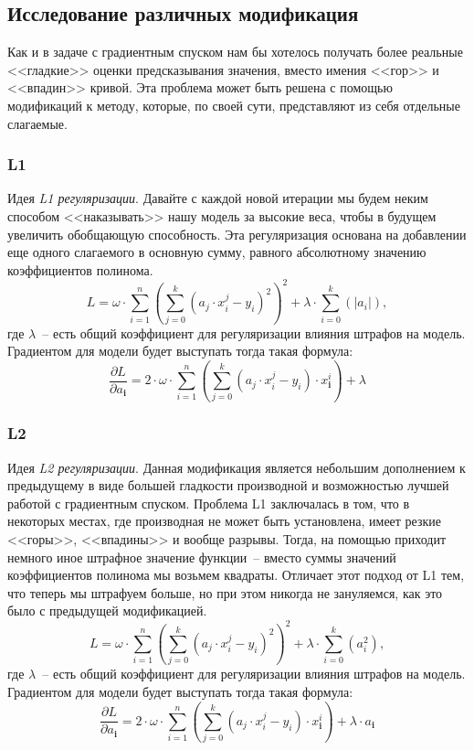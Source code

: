 \documentclass[12pt, a4paper, oneside, final]{article}
\begin{document}
	\subsection*{Исследование различных модификация}
	Как и в задаче с градиентным спуском нам бы хотелось получать более реальные <<гладкие>> оценки предсказывания значения, вместо имения <<гор>> и <<впадин>> кривой.
	Эта проблема может быть решена с помощью модификаций к методу, которые, по своей сути, представляют из себя отдельные слагаемые.
	\subsubsection*{L1}
	Идея \textit{L1 регуляризации}.
	Давайте с каждой новой итерации мы будем неким способом <<наказывать>> нашу модель за высокие веса, чтобы в будущем увеличить обобщающую способность.
	Эта регуляризация основана на добавлении еще одного слагаемого в основную сумму, равного абсолютному значению коэффициентов полинома.
	\[
		L = \omega \cdot \sum\limits_{i = 1}^{n}{\left(\sum\limits_{j = 0}^{k}{\left(a_{j} \cdot x_{i}^{j} - y_{i}\right)^{2}}\right)^{2}} + \lambda \cdot \sum\limits_{i = 0}^{k}{\left(|a_{i}|\right)},
	\]
	где $\lambda$~-- есть общий коэффициент для регуляризации влияния штрафов на модель.
	Градиентом для модели будет выступать тогда такая формула:
	\[
		\dfrac{\partial{L}}{\partial{a_{\mathbf{i}}}} = 2 \cdot \omega \cdot \sum\limits_{i = 1}^{n}{\left(\sum\limits_{j = 0}^{k}{\left(a_{j} \cdot x_{i}^{j} - y_{i}\right) \cdot x^{i}_{\mathbf{i}}}\right)} + \lambda
	\]
	\subsubsection*{L2}
	Идея \textit{L2 регуляризации}.
	Данная модификация является небольшим дополнением к предыдущему в виде большей гладкости производной и возможностью лучшей работой с градиентным спуском.
	Проблема L1 заключалась в том, что в некоторых местах, где производная не может быть установлена, имеет резкие <<горы>>, <<впадины>> и вообще разрывы.
	Тогда, на помощью приходит немного иное штрафное значение функции~-- вместо суммы значений коэффициентов полинома мы возьмем квадраты.
	Отличает этот подход от L1 тем, что теперь мы штрафуем больше, но при этом никогда не зануляемся, как это было с предыдущей модификацией.
	\[
		L = \omega \cdot \sum\limits_{i = 1}^{n}{\left(\sum\limits_{j = 0}^{k}{\left(a_{j} \cdot x_{i}^{j} - y_{i}\right)^{2}}\right)^{2}} + \lambda \cdot \sum\limits_{i = 0}^{k}{\left(a_{i}^{2}\right)},
	\]
	где $\lambda$~-- есть общий коэффициент для регуляризации влияния штрафов на модель.
	Градиентом для модели будет выступать тогда такая формула:
	\[
		\dfrac{\partial{L}}{\partial{a_{\mathbf{i}}}} = 2 \cdot \omega \cdot \sum\limits_{i = 1}^{n}{\left(\sum\limits_{j = 0}^{k}{\left(a_{j} \cdot x_{i}^{j} - y_{i}\right) \cdot x^{i}_{\mathbf{i}}}\right)} + \lambda \cdot a_{\mathbf{i}}
	\]
\end{document}
